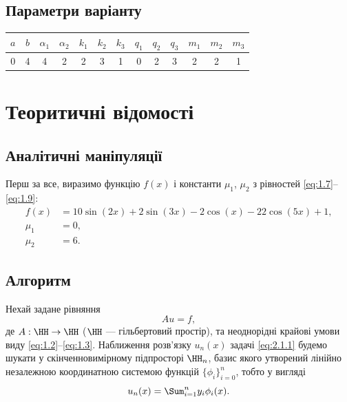 \subsection{Параметри варіанту}

\begin{table}[H]
    \centering
    \begin{tabular}{|c|c||c|c||c|c|c||c|c|c||c|c|c|}
        \hline
        $a$ & $b$ & $\alpha_1$ & $\alpha_2$ & $k_1$ & $k_2$ & $k_3$ & $q_1$ & $q_2$ & $q_3$ & $m_1$ & $m_2$ & $m_3$ \\ \hline
        0 & 4 & 4 & 2 & 2 & 3 & 1 & 0 & 2 & 3 & 2 & 2 & 1 \\ \hline
    \end{tabular}
\end{table}

\section{Теоритичні відомості}

\setcounter{subsection}{-1}
\subsection{Аналітичні маніпуляції}

Перш за все, виразимо функцію $f(x)$ і константи $\mu_1$, $\mu_2$ з рівностей \eqref{eq:1.7}--\eqref{eq:1.9}:
\begin{align}
    \label{eq:2.0.1}
    f(x) &= 10 \sin(2 x) + 2 \sin(3 x) - 2 \cos(x) - 22 \cos(5x) + 1, \\
    \label{eq:2.0.2}
    \mu_1 &= 0, \\
    \label{eq:2.0.3}
    \mu_2 &= 6.
\end{align}

\subsection{Алгоритм}

Нехай задане рівняння 
\begin{equation}
    \label{eq:2.1.1}
    A u = f,
\end{equation}
де $A: \HH \rightarrow \HH$ ($\HH$ --- гільбертовий простір), та неоднорідні крайові умови виду \eqref{eq:1.2}--\eqref{eq:1.3}. Наближення розв'язку $u_n(x)$ задачі \eqref{eq:2.1.1} будемо шукати у скінченновимірному підпросторі $\HH_n$, базис якого утворений лінійно незалежною координатною системою функцій $\{\phi_i\}_{i = 0}^n$, тобто у вигляді
\begin{equation}
    \label{eq:2.1.2}
    u_n(x) = \Sum_{i = 1}^n y_i \phi_i(x).
\end{equation}

